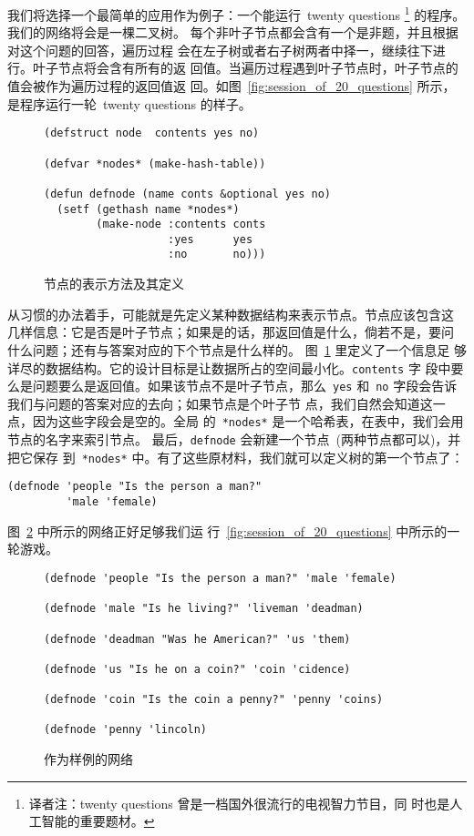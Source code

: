 我们将选择一个最简单的应用作为例子：一个能运行~twenty questions
\footnote{译者注：twenty questions 曾是一档国外很流行的电视智力节目，同
  时也是人工智能的重要题材。} 的程序。我们的网络将会是一棵二叉树。
每个非叶子节点都会含有一个是非题，并且根据对这个问题的回答，遍历过程
会在左子树或者右子树两者中择一，继续往下进行。叶子节点将会含有所有的返
回值。当遍历过程遇到叶子节点时，叶子节点的值会被作为遍历过程的返回值返
回。如图~\ref{fig:session_of_20_questions} 所示，是程序运行一轮~twenty
questions 的样子。

\begin{figure}
\begin{lstlisting}
(defstruct node  contents yes no)

(defvar *nodes* (make-hash-table))

(defun defnode (name conts &optional yes no)
  (setf (gethash name *nodes*)
        (make-node :contents conts
                   :yes      yes
                   :no       no)))
\end{lstlisting}
\caption{\label{fig:representation_and_definition_of_nodes}节点的表示方法及其定义
}
\end{figure}

从习惯的办法着手，可能就是先定义某种数据结构来表示节点。节点应该包含这
几样信息：它是否是叶子节点；如果是的话，那返回值是什么，倘若不是，要问
什么问题；还有与答案对应的下个节点是什么样的。
图~\ref{fig:representation_and_definition_of_nodes} 里定义了一个信息足
够详尽的数据结构。它的设计目标是让数据所占的空间最小化。\texttt{contents} 字
段中要么是问题要么是返回值。如果该节点不是叶子节点，那么~\texttt{yes}
和~\texttt{no} 字段会告诉我们与问题的答案对应的去向；如果节点是个叶子节
点，我们自然会知道这一点，因为这些字段会是空的。全局
的~\texttt{*nodes*} 是一个哈希表，在表中，我们会用节点的名字来索引节点。
最后，\texttt{defnode} 会新建一个节点~(两种节点都可以)，并把它保存
到~\texttt{*nodes*} 中。有了这些原材料，我们就可以定义树的第一个节点了：
\begin{lstlisting}
(defnode 'people "Is the person a man?"
         'male 'female)
\end{lstlisting}
图~\ref{fig:sample_network} 中所示的网络正好足够我们运
行~\ref{fig:session_of_20_questions} 中所示的一轮游戏。

\begin{figure}
\begin{lstlisting}
(defnode 'people "Is the person a man?" 'male 'female)

(defnode 'male "Is he living?" 'liveman 'deadman)

(defnode 'deadman "Was he American?" 'us 'them)

(defnode 'us "Is he on a coin?" 'coin 'cidence)

(defnode 'coin "Is the coin a penny?" 'penny 'coins)

(defnode 'penny 'lincoln)
\end{lstlisting}
\caption{\label{fig:sample_network}作为样例的网络}
\end{figure}


